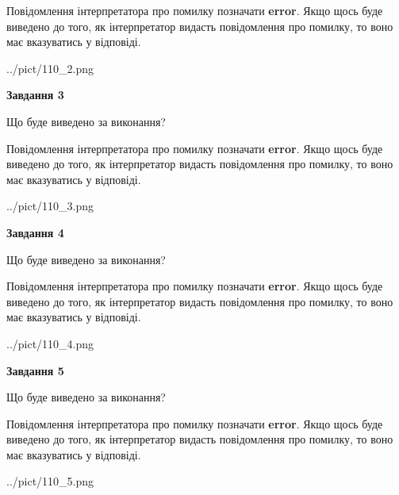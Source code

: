 \documentclass[12pt, ukrainian]{article}
\begin{document}
{\begin {large}
Повідомлення інтерпретатора про помилку позначати \textbf{error}.
Якщо щось буде виведено до того, як інтерпретатор видасть повідомлення про помилку, 
то воно має вказуватись у відповіді. \par


\begin{center}
	{../pict/110_2.png}
\end{center}
\newpage

{\begin {center}\textbf{Завдання 3}\end {center}}\par
Що буде виведено за виконання?

Повідомлення інтерпретатора про помилку позначати \textbf{error}.
Якщо щось буде виведено до того, як інтерпретатор видасть повідомлення про помилку, 
то воно має вказуватись у відповіді. \par


\begin{center}
	{../pict/110_3.png}
\end{center}
\newpage

{\begin {center}\textbf{Завдання 4}\end {center}}\par
Що буде виведено за виконання?

Повідомлення інтерпретатора про помилку позначати \textbf{error}.
Якщо щось буде виведено до того, як інтерпретатор видасть повідомлення про помилку, 
то воно має вказуватись у відповіді. \par


\begin{center}
	{../pict/110_4.png}
\end{center}
\newpage

{\begin {center}\textbf{Завдання 5}\end {center}}\par
Що буде виведено за виконання?

Повідомлення інтерпретатора про помилку позначати \textbf{error}.
Якщо щось буде виведено до того, як інтерпретатор видасть повідомлення про помилку, 
то воно має вказуватись у відповіді. \par


\begin{center}
	{../pict/110_5.png}
\end{center}
\newpage


\end{large}}
\end{document}
